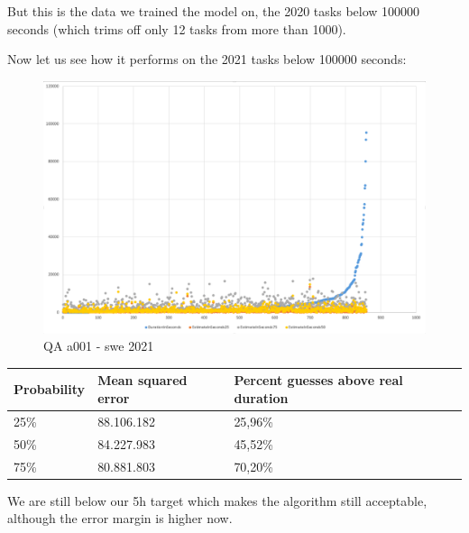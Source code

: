 But this is the data we trained the model on, the 2020 tasks below
100000 seconds (which trims off only 12 tasks from more than 1000).

Now let us see how it performs on the 2021 tasks below 100000 seconds:

\begin{figure}
\centering
\includegraphics{Documentation/10000-A001/a001-swe2021.png}
\caption{QA a001 - swe 2021}
\end{figure}

\begin{longtable}[]{@{}lll@{}}
\toprule
Probability & Mean squared error & Percent guesses above real
duration\tabularnewline
\midrule
\endhead
25\% & 88.106.182 & 25,96\%\tabularnewline
50\% & 84.227.983 & 45,52\%\tabularnewline
75\% & 80.881.803 & 70,20\%\tabularnewline
\bottomrule
\end{longtable}

We are still below our 5h target which makes the algorithm still
acceptable, although the error margin is higher now.
